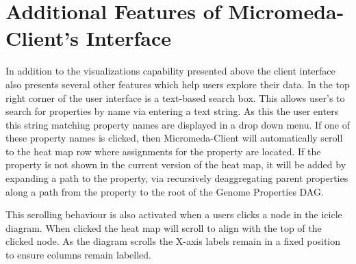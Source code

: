 \section{Additional Features of Micromeda-Client's Interface}

In addition to the visualizations capability presented above the client interface also presents several other features which help users explore their data. In the top right corner of the user interface is a text-based search box. This allows user's to search for properties by name via entering a text string. As this the user enters this string matching property names are displayed in a drop down menu. If one of these property names is clicked, then Micromeda-Client will automatically scroll to the heat map row where assignments for the property are located. If the property is not shown in the current version of the heat map, it will be added by expanding a path to the property, via recursively deaggregating parent properties along a path from the property to the root of the Genome Properties DAG.

This scrolling behaviour is also activated when a users clicks a node in the icicle diagram. When clicked the heat map will scroll to align with the top of the clicked node. As the diagram scrolls the X-axis labels remain in a fixed position to ensure columns remain labelled. 

